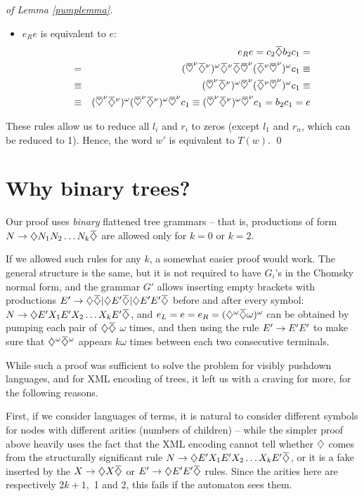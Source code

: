 \documentclass{article}
\begin{document}
\begin{proof}[of Lemma \ref{pumplemma}]
\begin{itemize}
\item $e_R e$ is equivalent to $e$:
\begin{eqnarray*}
&& e_R e = c_2 \ca b_2 c_1 = \\ &=&
(\cb^\nu \ca^\nu)^\omega \ca^\nu \ca \cb^\nu (\ca^\nu \cb^\nu)^\omega c_1 \equiv \\
&\equiv& (\cb^\nu \ca^\nu)^\omega \cb^\nu (\ca^\nu \cb^\nu)^\omega c_1 \equiv \\
&\equiv& (\cb^\nu \ca^\nu)^\omega (\cb^\nu \ca^\nu)^\omega \cb^\nu c_1 
\equiv (\cb^\nu \ca^\nu)^\omega \cb^\nu c_1 = b_2 c_1 = e
\end{eqnarray*}
\end{itemize}

These rules allow us to reduce all $l_i$ and $r_i$ to zeros (except $l_1$ and $r_n$,
which can be reduced to 1). Hence, the word $w'$ is equivalent to $T(w)$. \qed
\end{proof}

\section{Why binary trees?}

Our proof uses {\it binary} flattened tree grammars -- that is,
productions of form $N \ra \oa N_1 N_2 \ldots N_k \ca$ are allowed only for $k=0$
or $k=2$.

If we allowed such rules for any $k$, a somewhat easier proof would work.
The general structure is the same, but
it is not required to have $G_i$'s in the Chomsky normal form, 
and the grammar $G'$ allows inserting empty brackets with productions 
$E' \ra \oa\ca | \oa E' \ca | \oa E'E' \ca$ before and after every symbol:
$N \ra \oa E' X_1 E' X_2 \ldots X_k E' \ca$, and $e_L=e=e_R=(\oa^\omega \ca\omega)^\omega$
can be obtained by pumping each pair of $\oa\ca$ $\omega$ times, and then
using the rule $E' \rightarrow E'E'$ to make sure that $\oa^\omega \ca^\omega$ appears
$k\omega$ times between each two consecutive terminals.

While such a proof 
was sufficient to solve the problem for visibly pushdown languages, and for
XML encoding of trees, it left us with a craving for more, for the following
reasons.

First, if we consider languages of terms, it is natural to consider
different symbols for nodes with different arities (numbers of children) --
while the simpler proof above heavily uses the fact that the XML encoding cannot
tell whether $\diamondsuit$ comes from the structurally significant rule $N \ra \oa E' X_1 E' X_2 \ldots X_k E' \ca$,
or it is a fake inserted by the $X \ra \oa X \ca$ or $E' \ra \oa E' E' \ca$ rules.
Since the arities here are respectively $2k+1,$ 1 and 2, this fails if
the automaton sees them.
\end{document}
